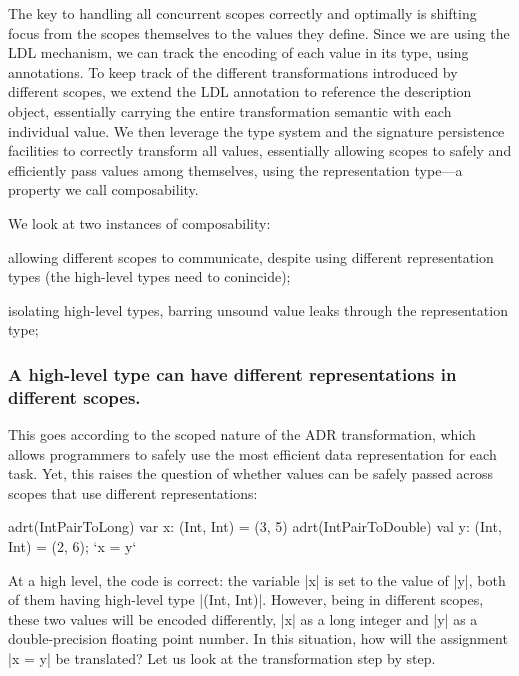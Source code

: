 The key to handling all concurrent scopes correctly and optimally is shifting focus from the scopes themselves to the values they define. Since we are using the LDL mechanism, we can track the encoding of each value in its type, using annotations. To keep track of the different transformations introduced by different scopes, we extend the LDL annotation to reference the description object, essentially carrying the entire transformation semantic with each individual value. We then leverage the type system and the signature persistence facilities to correctly transform all values, essentially allowing scopes to safely and efficiently pass values among themselves, using the representation type---a property we call composability.

We look at two instances of composability:

\begin{compactitem}
  \item allowing different scopes to communicate, despite using different representation types (the high-level types need to conincide);
  \item isolating high-level types, barring unsound value leaks through the representation type;
\end{compactitem}

\subsubsection{A high-level type can have different representations in different scopes.} This goes according to the scoped nature of the ADR transformation, which allows programmers to safely use the most efficient data representation for each task. Yet, this raises the question of whether values can be safely passed across scopes that use different representations:

\begin{lstlisting-nobreak}
adrt(IntPairToLong)   { var x: (Int, Int) = (3, 5) }
adrt(IntPairToDouble) { val y: (Int, Int) = (2, 6); `x = y` }
\end{lstlisting-nobreak}

At a high level, the code is correct: the variable |x| is set to the value of |y|, both of them having high-level type |(Int, Int)|. However, being in different scopes, these two values will be encoded differently, |x| as a long integer and |y| as a double-precision floating point number. In this situation, how will the assignment |x = y| be translated? Let us look at the transformation step by step.

